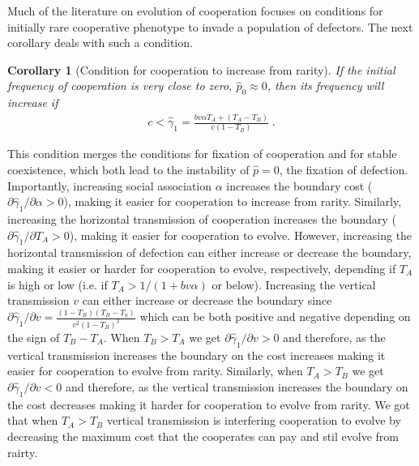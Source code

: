 \documentclass[12pt]{extarticle}
\newtheorem{corollary}{Corollary}
\begin{document}
{Much of the literature on evolution of cooperation focuses on conditions for  initially rare cooperative phenotype to invade a population of defectors.
The next corollary deals with such a condition.
\\

\begin{corollary}[Condition for cooperation to increase from rarity]
\label{corollary:rarity}
  If the initial frequency of cooperation is very close to zero, $\hat{p}_0 \approx 0$, then its frequency will increase if 
  \begin{equation} \label{eq:unequal_transmission_from_rarity_general_case}
  \begin{aligned}
  c < \hat\gamma_1 = \frac{b v \alpha T_A + (T_A - T_B)}{v(1-T_B)} \;.
  \end{aligned}
  \end{equation} 
  \end{corollary}

This condition merges the conditions for fixation of cooperation and for stable coexistence, which both lead to the instability of $\hat{p}=0$, the fixation of defection.
Importantly, increasing social association $\alpha$ increases the boundary cost ($\partial \hat\gamma_1 / \partial \alpha > 0$), making it easier for cooperation to increase from rarity.
Similarly, increasing the horizontal transmission of cooperation increases the boundary ($\partial \hat\gamma_1 / \partial T_A > 0$), making it easier for cooperation to evolve.
However, increasing the horizontal transmission of defection can either increase or decrease the boundary, making it easier or harder for cooperation to evolve, respectively, depending if $T_A$ is high or low (i.e. if $T_A>1/(1+bv\alpha)$ or below).
Increasing the vertical transmission $v$ can either increase or decrease the boundary since $\partial \hat\gamma_1 / \partial v = \frac{(1-T_B)(T_B-T_a)}{v^2(1-T_B)^2}$ which can be both positive and negative depending on the sign of $T_B-T_A$.
When $T_B>T_A$ we get $\partial \hat\gamma_1 / \partial v >0$ and therefore, as the vertical transmission increases the boundary on the cost increases making it easier for cooperation to evolve from rarity.
Similarly, when $T_A > T_B$ we get $\partial \hat\gamma_1 / \partial v <0$ and therefore, as the vertical transmission increases the boundary on the cost decreases making it harder for cooperation to evolve from rarity.
We got that when $T_A>T_B$ vertical transmission is interfering cooperation to evolve by decreasing the maximum cost that the cooperates can pay and stil evolve from rairty. 

}
\end{document}
